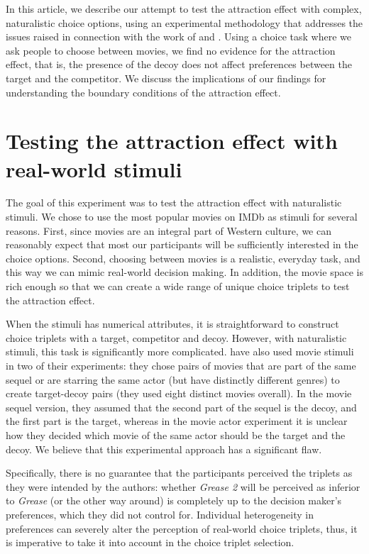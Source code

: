 \documentclass[12pt, a4paper]{article}
\begin{document}
In this article, we describe our attempt to test the attraction effect with complex, naturalistic choice options, using an experimental methodology that addresses the issues raised in connection with the work of \citeauthor{Frederick2014} and \citeauthor{Yang2014}. Using a choice task where we ask people to choose between movies, we find no evidence for the attraction effect, that is, the presence of the decoy does not affect preferences between the target and the competitor. We discuss the implications of our findings for understanding the boundary conditions of the attraction effect.

\section{Testing the attraction effect with real-world stimuli}

The goal of this experiment was to test the attraction effect with naturalistic stimuli. We chose to use the most popular movies on IMDb as stimuli for several reasons. First, since movies are an integral part of Western culture, we can reasonably expect that most our participants will be sufficiently interested in the choice options. Second, choosing between movies is a realistic, everyday task, and this way we can mimic real-world decision making. In addition, the movie space is rich enough so that we can create a wide range of unique choice triplets to test the attraction effect.

When the stimuli has numerical attributes, it is straightforward to construct choice triplets with a target, competitor and decoy. However, with naturalistic stimuli, this task is significantly more complicated. \citeauthor{Frederick2014} have also used movie stimuli in two of their experiments: they chose pairs of movies that are part of the same sequel or are starring the same actor (but have distinctly different genres) to create target-decoy pairs (they used eight distinct movies overall). In the movie sequel version, they assumed that the second part of the sequel is the decoy, and the first part is the target, whereas in the movie actor experiment it is unclear how they decided which movie of the same actor should be the target and the decoy. We believe that this experimental approach has a significant flaw. 

Specifically, there is no guarantee that the participants perceived the triplets as they were intended by the authors: whether \textit{Grease 2} will be perceived as inferior to \textit{Grease} (or the other way around) is completely up to the decision maker's preferences, which they did not control for. Individual heterogeneity in preferences can severely alter the perception of real-world choice triplets, thus, it is imperative to take it into account in the choice triplet selection. 
\end{document}
